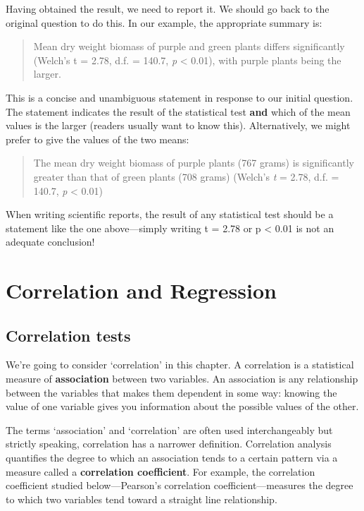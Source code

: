 \documentclass[
]{book}
\begin{document}
Having obtained the result, we need to report it. We should go back to the original question to do this. In our example, the appropriate summary is:

\begin{quote}
Mean dry weight biomass of purple and green plants differs significantly (Welch's t = 2.78, d.f. = 140.7, \emph{p} \textless{} 0.01), with purple plants being the larger.
\end{quote}

This is a concise and unambiguous statement in response to our initial question. The statement indicates the result of the statistical test \textbf{and} which of the mean values is the larger (readers usually want to know this). Alternatively, we might prefer to give the values of the two means:

\begin{quote}
The mean dry weight biomass of purple plants (767 grams) is significantly greater than that of green plants (708 grams) (Welch's \emph{t} = 2.78, d.f. = 140.7, \emph{p} \textless{} 0.01)
\end{quote}

When writing scientific reports, the result of any statistical test should be a statement like the one above---simply writing t = 2.78 or p \textless{} 0.01 is not an adequate conclusion!

\hypertarget{part-correlation-and-regression}{%
\part{Correlation and Regression}\label{part-correlation-and-regression}}

\hypertarget{correlation-tests}{%
\chapter{Correlation tests}\label{correlation-tests}}

We're going to consider `correlation' in this chapter. A correlation is a statistical measure of \textbf{association} between two variables. An association is any relationship between the variables that makes them dependent in some way: knowing the value of one variable gives you information about the possible values of the other.

The terms `association' and `correlation' are often used interchangeably but strictly speaking, correlation has a narrower definition. Correlation analysis quantifies the degree to which an association tends to a certain pattern via a measure called a \textbf{correlation coefficient}. For example, the correlation coefficient studied below---Pearson's correlation coefficient---measures the degree to which two variables tend toward a straight line relationship.
\end{document}
